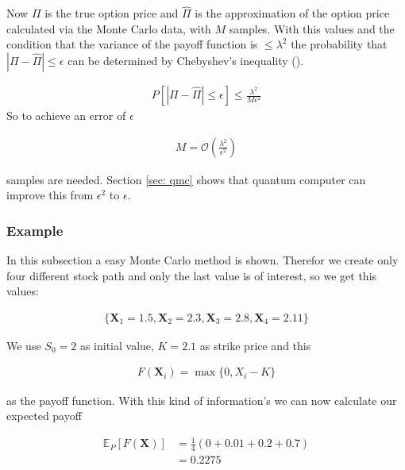 \documentclass[../../main.tex]{subfiles}
\begin{document}
Now $\Pi$ is the true option price and $\hat{\Pi}$ is the approximation of the option price calculated via the Monte Carlo data, with $M$ samples. With this values and the condition that the variance of the payoff function is $ \leq \lambda^2$ the probability that $|\Pi-\hat{\Pi}| \leq \epsilon$ can be determined by Chebyshev’s inequality (\cite{Montanaro_2015}).

\begin{align}
	        P[|\Pi-\hat{\Pi}| \leq \epsilon] \leq \frac{\lambda^2}{M\epsilon^2}
	    \end{align}
So to achieve an error of $\epsilon$

\begin{align}
	        M=\mathcal{O}(\frac{\lambda^2}{\epsilon^2}) \label{eq:classic_M}
\end{align}

samples are needed. Section \ref{sec: qmc} shows that quantum computer can improve this from $\epsilon^2$ to $\epsilon$.

\subsubsection{Example} \label{seq:MC_example}
In this subsection a easy Monte Carlo method is shown. Therefor we create only four different stock path and only the last value is of interest, so we get this values:

\begin{align}
    \{\textbf{X}_1=1.5, \textbf{X}_2=2.3, \textbf{X}_3=2.8, \textbf{X}_4=2.11\} \nonumber
\end{align}

We use $S_0=2$ as initial value, $K=2.1$ as strike price and this

\begin{align}
    F(\textbf{X}_i) = \max\{0, X_i - K\} \label{eq:MC_example_european}
\end{align}

as the payoff function. With this kind of information's we can now calculate our expected payoff

\begin{align}
    \mathbb{E}_P[F(\textbf{X})] &= \frac{1}{4}(0+0.01+0.2+0.7 ) \nonumber \\
    &= 0.2275 \nonumber
\end{align}

\biblio
\end{document}
